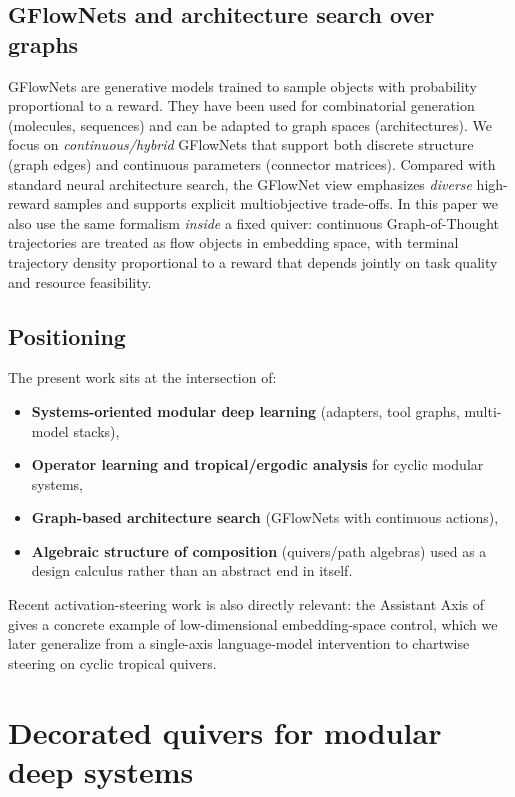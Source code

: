 \documentclass[11pt]{article}
\theoremstyle{definition}
\theoremstyle{plain}
\theoremstyle{remark}
\begin{document}
\subsection{GFlowNets and architecture search over graphs}
GFlowNets are generative models trained to sample objects with probability proportional to a reward.
They have been used for combinatorial generation (molecules, sequences) and can be adapted to graph spaces (architectures).
We focus on \emph{continuous/hybrid} GFlowNets that support both discrete structure (graph edges) and continuous parameters (connector matrices).
Compared with standard neural architecture search, the GFlowNet view emphasizes \emph{diverse} high-reward samples and supports explicit multiobjective trade-offs.
In this paper we also use the same formalism \emph{inside} a fixed quiver:
continuous Graph-of-Thought trajectories are treated as flow objects in embedding space, with terminal trajectory density proportional to a reward that depends jointly on task quality and resource feasibility.

\subsection{Positioning}
The present work sits at the intersection of:
\begin{itemize}[leftmargin=2em]
\item \textbf{Systems-oriented modular deep learning} (adapters, tool graphs, multi-model stacks),
\item \textbf{Operator learning and tropical/ergodic analysis} for cyclic modular systems,
\item \textbf{Graph-based architecture search} (GFlowNets with continuous actions),
\item \textbf{Algebraic structure of composition} (quivers/path algebras) used as a design calculus rather than an abstract end in itself.
\end{itemize}
Recent activation-steering work is also directly relevant:
the Assistant Axis of \cite{AnthropicAssistantAxis2026,LuGallagherMichalaFishLindsey2026} gives a concrete example of low-dimensional embedding-space control, which we later generalize from a single-axis language-model intervention to chartwise steering on cyclic tropical quivers.

\newpage

\section{Decorated quivers for modular deep systems}
\label{sec:quiver}
\end{document}
